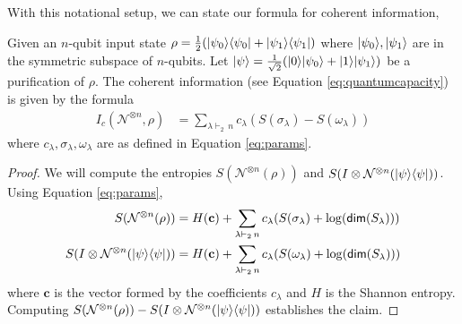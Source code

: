 \documentclass[11pt]{article}
\DeclarePairedDelimiter\bra{\langle}{\rvert}
\DeclarePairedDelimiter\ket{\lvert}{\rangle}
\begin{document}
With this notational setup, we can state our formula for coherent information,
\begin{theorem}
    Given an $n$-qubit input state $\rho = \frac{1}{2}(\ket{\psi_0}\bra{\psi_0} + \ket{\psi_1}\bra{\psi_1})$ where $\ket{\psi_0}, \ket{\psi_1}$ are in the symmetric subspace of $n$-qubits. Let $\ket{\psi} = \frac{1}{\sqrt{2}}(\ket{0}\ket{\psi_0} + \ket{1}\ket{\psi_1})$ be a purification of $\rho$. The coherent information (see Equation \ref{eq:quantumcapacity}) is given by the formula
    \begin{align*}
        I_c(\mathcal{N}^{\otimes n}, \rho) &= \sum_{\lambda \vdash_2\, n} c_{\lambda} (S(\sigma_{\lambda}) - S(\omega_{\lambda}))
    \end{align*}
    where $c_{\lambda}, \sigma_{\lambda}, \omega_{\lambda}$ are as defined in Equation \ref{eq:params}.
\end{theorem}
\begin{proof}
     We will compute the entropies $S(\mathcal{N}^{\otimes n}(\rho))$ and $S(I \otimes \mathcal{N}^{\otimes n}(\ket{\psi}\bra{\psi}))$. Using Equation \ref{eq:params},
     \begin{align*}
        S(\mathcal{N}^{\otimes n}(\rho)) &= H(\mathbf{c}) + \sum_{\lambda \vdash_2\, n} c_{\lambda}(S(\sigma_{\lambda}) + \log(\mathsf{dim}(S_{\lambda}))) \\
        S(I \otimes \mathcal{N}^{\otimes n}(\ket{\psi}\bra{\psi})) &= H(\mathbf{c}) + \sum_{\lambda \vdash_2\, n} c_{\lambda}(S(\omega_{\lambda}) + \log(\mathsf{dim}(S_{\lambda})))
     \end{align*}
     where $\mathbf{c}$ is the vector formed by the coefficients $c_{\lambda}$ and $H$ is the Shannon entropy. Computing $S(\mathcal{N}^{\otimes n}(\rho)) - S(I \otimes \mathcal{N}^{\otimes n}(\ket{\psi}\bra{\psi}))$ establishes the claim.
\end{proof}
\end{document}
